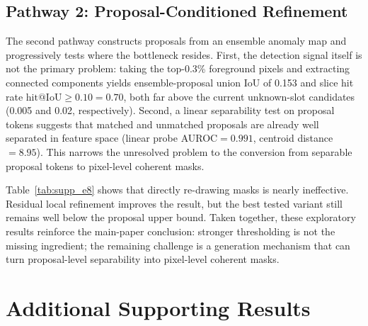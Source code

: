 \documentclass[11pt]{article}
\begin{document}
\subsection{Pathway 2: Proposal-Conditioned Refinement}

The second pathway constructs proposals from an ensemble anomaly map and progressively
tests where the bottleneck resides.
First, the detection signal itself is not the primary problem: taking the top-0.3\%
foreground pixels and extracting connected components yields ensemble-proposal union IoU
of 0.153 and slice hit rate $\text{hit@IoU}{\geq}0.10=0.70$, both far above the current
unknown-slot candidates (0.005 and 0.02, respectively).
Second, a linear separability test on proposal tokens suggests that matched and
unmatched proposals are already well separated in feature space (linear probe
AUROC$=0.991$, centroid distance$=8.95$).
This narrows the unresolved problem to the conversion from separable proposal tokens to
pixel-level coherent masks.

\begin{table}[h]
\centering
\caption{Comparison of proposal-conditioned refinement variants against the ensemble proposal upper bound on Synapse A2.}
\label{tab:supp_e8}
%
\end{table}

Table~\ref{tab:supp_e8} shows that directly re-drawing masks is nearly ineffective.
Residual local refinement improves the result, but the best tested variant still
remains well below the proposal upper bound. Taken together, these exploratory results
reinforce the main-paper conclusion: stronger thresholding is not the missing ingredient;
the remaining challenge is a generation mechanism that can turn proposal-level
separability into pixel-level coherent masks.

\section{Additional Supporting Results}
\end{document}
